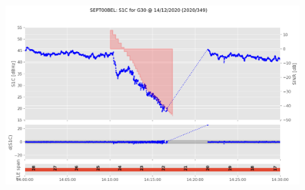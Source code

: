 \begin{enumerate}
\begin{figure}[H]%
\centering%
\includegraphics[width=0.95\linewidth]{png/SEPT00BEL_R_20203491400_30M_01S_MO_G-S1C-G30.png}%
\end{figure}


\end{enumerate}
